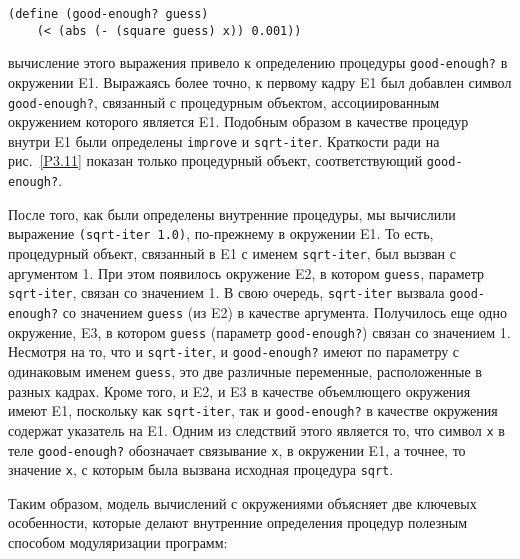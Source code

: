 \begin{Verbatim}[fontsize=\small]
  (define (good-enough? guess)
    (< (abs (- (square guess) x)) 0.001))
\end{Verbatim}
вычисление этого выражения привело к определению процедуры
{\tt good-enough?} в окружении E1.  Выражаясь более точно, к
первому кадру E1 был добавлен символ {\tt good-enough?},
связанный с процедурным объектом, ассоциированным окружением которого
является E1.  Подобным образом в качестве процедур внутри E1 были
определены {\tt improve} и {\tt sqrt-iter}.  Краткости
ради на рис.~\ref{P3.11} показан только процедурный
объект, соответствующий {\tt good-enough?}.
{\sloppy

}
После того, как были определены внутренние процедуры, мы
вычислили выражение {\tt (sqrt-iter 1.0)}, по-прежнему в
окружении E1.  То есть, процедурный объект, связанный в E1 с именем
{\tt sqrt-iter}, был вызван с аргументом 1.  При этом появилось
окружение E2, в котором {\tt guess}, параметр
{\tt sqrt-iter}, связан со значением 1.  В свою очередь,
{\tt sqrt-iter} вызвала {\tt good-enough?} со значением
{\tt guess} (из E2) в качестве аргумента.  Получилось еще одно
окружение, E3, в котором {\tt guess} (параметр
{\tt good-enough?}) связан со значением 1.  Несмотря на то, что
и {\tt sqrt-iter}, и {\tt good-enough?} имеют по
параметру с одинаковым именем {\tt guess}, это две различные переменные,
расположенные в разных кадрах.  Кроме того, и E2, и E3 в качестве
объемлющего окружения имеют E1, поскольку как {\tt sqrt-iter},
так и {\tt good-enough?} в качестве
окружения содержат указатель на E1.  Одним из следствий этого является
то, что символ {\tt x} в теле
{\tt good-enough?} обозначает связывание  {\tt x},
в окружении E1, а точнее, то значение {\tt x}, с которым
была вызвана исходная процедура {\tt sqrt}.

Таким образом, модель вычислений с окружениями объясняет
две ключевых особенности, которые делают внутренние определения
процедур полезным способом модуляризации программ:

